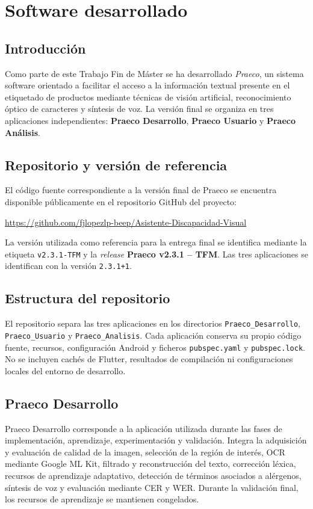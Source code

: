 \chapter{Software desarrollado}
\label{ap:software}

\section{Introducción}
Como parte de este Trabajo Fin de Máster se ha desarrollado \textit{Praeco}, un sistema software orientado a facilitar el acceso a la información textual presente en el etiquetado de productos mediante técnicas de visión artificial, reconocimiento óptico de caracteres y síntesis de voz. La versión final se organiza en tres aplicaciones independientes: \textbf{Praeco Desarrollo}, \textbf{Praeco Usuario} y \textbf{Praeco Análisis}.

\section{Repositorio y versión de referencia}
El código fuente correspondiente a la versión final de Praeco se encuentra disponible públicamente en el repositorio GitHub del proyecto:
\begin{center}
\url{https://github.com/fjlopezlp-beep/Asistente-Discapacidad-Visual}
\end{center}
La versión utilizada como referencia para la entrega final se identifica mediante la etiqueta \texttt{v2.3.1-TFM} y la \textit{release} \textbf{Praeco v2.3.1 -- TFM}. Las tres aplicaciones se identifican con la versión \texttt{2.3.1+1}.

\section{Estructura del repositorio}
El repositorio separa las tres aplicaciones en los directorios \texttt{Praeco\_Desarrollo}, \texttt{Praeco\_Usuario} y \texttt{Praeco\_Analisis}. Cada aplicación conserva su propio código fuente, recursos, configuración Android y ficheros \texttt{pubspec.yaml} y \texttt{pubspec.lock}. No se incluyen cachés de Flutter, resultados de compilación ni configuraciones locales del entorno de desarrollo.

\section{Praeco Desarrollo}
Praeco Desarrollo corresponde a la aplicación utilizada durante las fases de implementación, aprendizaje, experimentación y validación. Integra la adquisición y evaluación de calidad de la imagen, selección de la región de interés, OCR mediante Google ML Kit, filtrado y reconstrucción del texto, corrección léxica, recursos de aprendizaje adaptativo, detección de términos asociados a alérgenos, síntesis de voz y evaluación mediante CER y WER. Durante la validación final, los recursos de aprendizaje se mantienen congelados.

